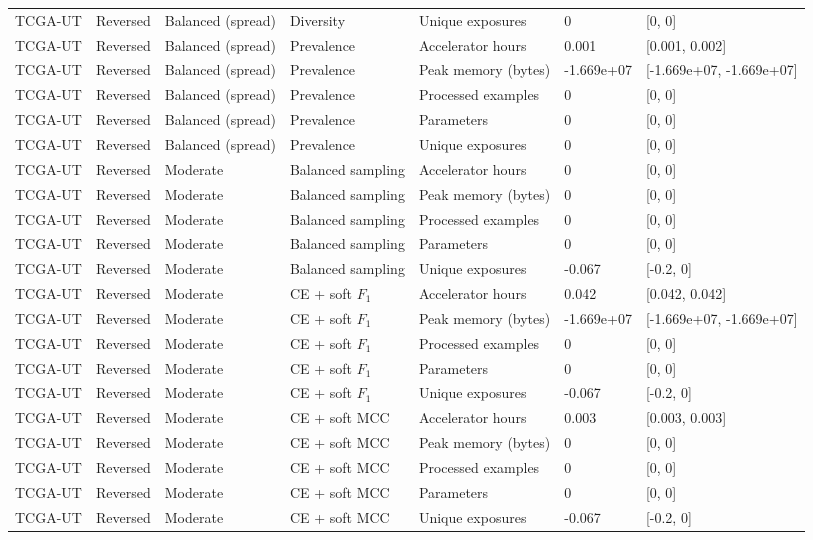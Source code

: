 \begin{longtable}{lllllll}
TCGA-UT & Reversed & Balanced (spread) & Diversity & Unique exposures & 0 & [0, 0] \\
TCGA-UT & Reversed & Balanced (spread) & Prevalence & Accelerator hours & 0.001 & [0.001, 0.002] \\
TCGA-UT & Reversed & Balanced (spread) & Prevalence & Peak memory (bytes) & -1.669e+07 & [-1.669e+07, -1.669e+07] \\
TCGA-UT & Reversed & Balanced (spread) & Prevalence & Processed examples & 0 & [0, 0] \\
TCGA-UT & Reversed & Balanced (spread) & Prevalence & Parameters & 0 & [0, 0] \\
TCGA-UT & Reversed & Balanced (spread) & Prevalence & Unique exposures & 0 & [0, 0] \\
TCGA-UT & Reversed & Moderate & Balanced sampling & Accelerator hours & 0 & [0, 0] \\
TCGA-UT & Reversed & Moderate & Balanced sampling & Peak memory (bytes) & 0 & [0, 0] \\
TCGA-UT & Reversed & Moderate & Balanced sampling & Processed examples & 0 & [0, 0] \\
TCGA-UT & Reversed & Moderate & Balanced sampling & Parameters & 0 & [0, 0] \\
TCGA-UT & Reversed & Moderate & Balanced sampling & Unique exposures & -0.067 & [-0.2, 0] \\
TCGA-UT & Reversed & Moderate & CE + soft $F_1$ & Accelerator hours & 0.042 & [0.042, 0.042] \\
TCGA-UT & Reversed & Moderate & CE + soft $F_1$ & Peak memory (bytes) & -1.669e+07 & [-1.669e+07, -1.669e+07] \\
TCGA-UT & Reversed & Moderate & CE + soft $F_1$ & Processed examples & 0 & [0, 0] \\
TCGA-UT & Reversed & Moderate & CE + soft $F_1$ & Parameters & 0 & [0, 0] \\
TCGA-UT & Reversed & Moderate & CE + soft $F_1$ & Unique exposures & -0.067 & [-0.2, 0] \\
TCGA-UT & Reversed & Moderate & CE + soft MCC & Accelerator hours & 0.003 & [0.003, 0.003] \\
TCGA-UT & Reversed & Moderate & CE + soft MCC & Peak memory (bytes) & 0 & [0, 0] \\
TCGA-UT & Reversed & Moderate & CE + soft MCC & Processed examples & 0 & [0, 0] \\
TCGA-UT & Reversed & Moderate & CE + soft MCC & Parameters & 0 & [0, 0] \\
TCGA-UT & Reversed & Moderate & CE + soft MCC & Unique exposures & -0.067 & [-0.2, 0] \\

\end{longtable}
